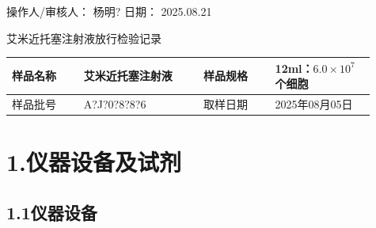 \documentclass[UTF8,10pt,a4paper,fontset=fandol]{ctexart}
\newcommand{\fieldvalue}[1]{#1}
\newcommand{\handwritten}[1]{#1}
\begin{document}
\vfill

\noindent 操作人/审核人：%
\fieldvalue{\handwritten{杨明?}}
\hfill
日期：%
\fieldvalue{\handwritten{2025.08.21}}

\newpage

\begin{center}
{\Large 艾米近托塞注射液放行检验记录}\\[2mm]
\begin{tabular}{|p{0.18\linewidth}|p{0.30\linewidth}|p{0.18\linewidth}|p{0.25\linewidth}|}
\hline
样品名称 &
\fieldvalue{艾米近托塞注射液} &
样品规格 &
\fieldvalue{12ml：$6.0\times10^{7}$个细胞}
\\ \hline
样品批号 &
\fieldvalue{\handwritten{A?J?0?8?8?6}} &
取样日期 &
\fieldvalue{\handwritten{2025年08月05日}}
\\ \hline
\end{tabular}
\end{center}

\section*{1.\quad 仪器设备及试剂}

\subsection*{1.1\quad 仪器设备}
\end{document}
